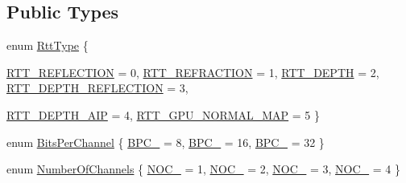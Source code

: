 \subsection*{Public Types}
\begin{CompactItemize}
\item 
enum \hyperlink{class_hydrax_1_1_rtt_manager_9753d012b355eba64cff2b19bb6f76ed}{RttType} \{ \par
\hyperlink{class_hydrax_1_1_rtt_manager_9753d012b355eba64cff2b19bb6f76ed46bf97fd6dfb5127e198ba5864d177cf}{RTT\_\-REFLECTION} =  0, 
\hyperlink{class_hydrax_1_1_rtt_manager_9753d012b355eba64cff2b19bb6f76ed19faf1e23955005ac93e096fb9c7745a}{RTT\_\-REFRACTION} =  1, 
\hyperlink{class_hydrax_1_1_rtt_manager_9753d012b355eba64cff2b19bb6f76ed8a220f3d2252dd891f89d11242f9d0f6}{RTT\_\-DEPTH} =  2, 
\hyperlink{class_hydrax_1_1_rtt_manager_9753d012b355eba64cff2b19bb6f76ed307732729f853596d0e8015b707ccea7}{RTT\_\-DEPTH\_\-REFLECTION} =  3, 
\par
\hyperlink{class_hydrax_1_1_rtt_manager_9753d012b355eba64cff2b19bb6f76ed4d2aa8377c7593dcb15b656f4eb1bf1b}{RTT\_\-DEPTH\_\-AIP} =  4, 
\hyperlink{class_hydrax_1_1_rtt_manager_9753d012b355eba64cff2b19bb6f76ede6e0cfde4b1fec5edfc11becf329f9b1}{RTT\_\-GPU\_\-NORMAL\_\-MAP} =  5
 \}
\item 
enum \hyperlink{class_hydrax_1_1_rtt_manager_ab09efbd8ec25f88656a27d6a4f0446e}{BitsPerChannel} \{ \hyperlink{class_hydrax_1_1_rtt_manager_ab09efbd8ec25f88656a27d6a4f0446ecef13aa48bb44d2dddfce5f2705246de}{BPC\_} =  8, 
\hyperlink{class_hydrax_1_1_rtt_manager_ab09efbd8ec25f88656a27d6a4f0446ec40c0b76eaa0f93d42f8ad5835f2e6df}{BPC\_} =  16, 
\hyperlink{class_hydrax_1_1_rtt_manager_ab09efbd8ec25f88656a27d6a4f0446edcc7a5caa6ce6602c0029e67e7ff8b52}{BPC\_} =  32
 \}
\item 
enum \hyperlink{class_hydrax_1_1_rtt_manager_8f74f31025f23f6ed8930a0d79a70731}{NumberOfChannels} \{ \hyperlink{class_hydrax_1_1_rtt_manager_8f74f31025f23f6ed8930a0d79a70731853812ba55b1b6e4ff7a6dc363851d37}{NOC\_} =  1, 
\hyperlink{class_hydrax_1_1_rtt_manager_8f74f31025f23f6ed8930a0d79a707312db56c36f66ea12cbdc86c16c9239847}{NOC\_} =  2, 
\hyperlink{class_hydrax_1_1_rtt_manager_8f74f31025f23f6ed8930a0d79a70731d61a5de75944638e15e54f0c87d4d40c}{NOC\_} =  3, 
\hyperlink{class_hydrax_1_1_rtt_manager_8f74f31025f23f6ed8930a0d79a7073173ec4033a84d7e46c6bddc956dc1a27f}{NOC\_} =  4
 \}

\end{CompactItemize}
